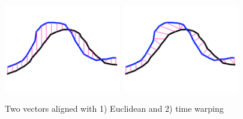 \begin{figure}
  \begin{center}
  \includegraphics[width=2in]{images/dtw-raw.PNG}
  \includegraphics[width=2in]{images/dtw-window.PNG}
  \caption{Two vectors aligned with 1) Euclidean and 2) time warping}
  \label{fig:teaser}
  \end{center}  
\end{figure}
